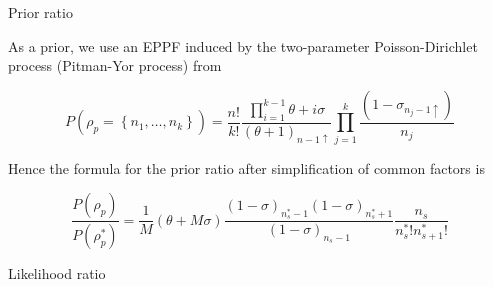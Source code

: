 \begin{frame}{Prior ratio}

As a prior, we use an EPPF induced by the \alert{two-parameter Poisson-Dirichlet} process
(Pitman-Yor process) from \cite{martinezNonparametricChangePoint2014} 

\begin{equation*}
    P\left(\rho_p=\left\{n_1, \ldots, n_k\right\}\right)
    =
    \frac{n!}{k!} \frac{ \prod_{i=1}^{k-1}{ \theta +i\sigma} }{(\theta+1)_{n-1\uparrow}} \prod_{j=1}^{k}{\frac{(1-\sigma_{n_{j}-1\uparrow})}{n_{j}} }
\end{equation*}


Hence the formula for \alert{the prior ratio} after simplification of common factors is


\begin{equation*}
    \frac{P(\rho_p)}{P(\rho_p^{*})}
    =
    \frac{1}{M}(\theta+M\sigma)\frac{(1-\sigma)_{n_{s}^{*}-1}(1-\sigma)_{n_{s}^{*}+1}}{(1-\sigma)_{n_{s}-1}}\frac{n_{s}}{n^{*}_{s}!n^{*}_{s+1}!}
\end{equation*}


\end{frame}


\begin{frame}{Likelihood ratio}



\end{frame}


